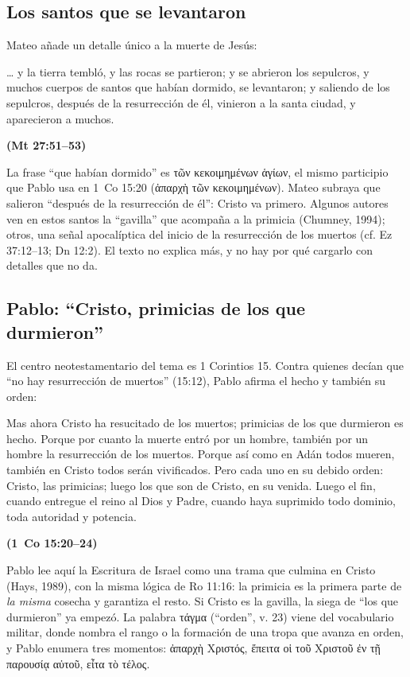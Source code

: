 \documentclass[11pt,letterpaper]{article}
\newcommand{\grc}[1]{\foreignlanguage{ancientgreek}{#1}}
\newcommand{\fuente}[1]{\par\hfill{\upshape\bfseries\small\textcolor{tierraroja}{#1}}}
\begin{document}
\subsection{Los santos que se levantaron}
Mateo añade un detalle único a la muerte de Jesús:

\begin{cita}\ldots{} y la tierra tembló, y las rocas se partieron; y se abrieron los sepulcros, y muchos cuerpos de santos que habían dormido, se levantaron; y saliendo de los sepulcros, después de la resurrección de él, vinieron a la santa ciudad, y aparecieron a muchos.\fuente{(Mt 27:51--53)}\end{cita}

La frase ``que habían dormido'' es \grc{τῶν κεκοιμημένων ἁγίων}, el mismo participio que Pablo usa en 1~Co 15:20 (\grc{ἀπαρχὴ τῶν κεκοιμημένων}). Mateo subraya que salieron ``después de la resurrección de él'': Cristo va primero. Algunos autores ven en estos santos la ``gavilla'' que acompaña a la primicia (Chumney, 1994); otros, una señal apocalíptica del inicio de la resurrección de los muertos (cf. Ez 37:12--13; Dn 12:2). El texto no explica más, y no hay por qué cargarlo con detalles que no da.

\subsection{Pablo: ``Cristo, primicias de los que durmieron''}
El centro neotestamentario del tema es 1 Corintios 15. Contra quienes decían que ``no hay resurrección de muertos'' (15:12), Pablo afirma el hecho y también su orden:

\begin{cita}Mas ahora Cristo ha resucitado de los muertos; primicias de los que durmieron es hecho. Porque por cuanto la muerte entró por un hombre, también por un hombre la resurrección de los muertos. Porque así como en Adán todos mueren, también en Cristo todos serán vivificados. Pero cada uno en su debido orden: Cristo, las primicias; luego los que son de Cristo, en su venida. Luego el fin, cuando entregue el reino al Dios y Padre, cuando haya suprimido todo dominio, toda autoridad y potencia.\fuente{(1~Co 15:20--24)}\end{cita}

Pablo lee aquí la Escritura de Israel como una trama que culmina en Cristo (Hays, 1989), con la misma lógica de Ro 11:16: la primicia es la primera parte de \emph{la misma} cosecha y garantiza el resto. Si Cristo es la gavilla, la siega de ``los que durmieron'' ya empezó. La palabra \grc{τάγμα} (``orden'', v. 23) viene del vocabulario militar, donde nombra el rango o la formación de una tropa que avanza en orden, y Pablo enumera tres momentos: \grc{ἀπαρχὴ Χριστός}, \grc{ἔπειτα οἱ τοῦ Χριστοῦ ἐν τῇ παρουσίᾳ αὐτοῦ}, \grc{εἶτα τὸ τέλος}.
\end{document}

